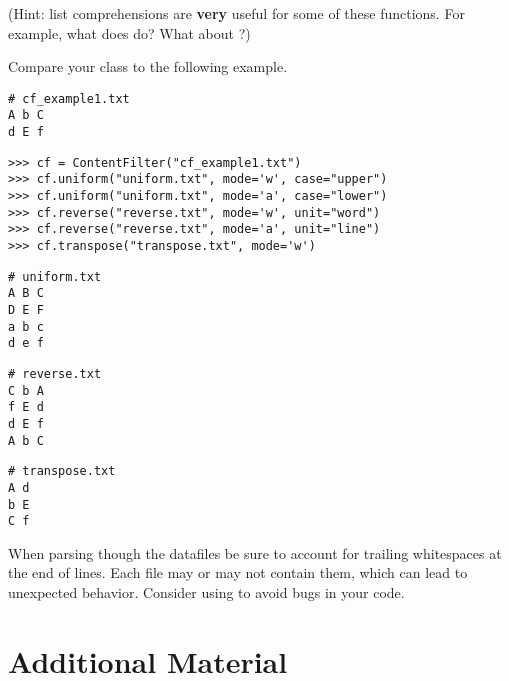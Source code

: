 \begin{problem}
\begin{enumerate}
\end{enumerate}

(Hint: list comprehensions are \textbf{very} useful for some of these functions.
For example, what does  do?
What about ?)

Compare your class to the following example.

\begin{lstlisting}
# cf_example1.txt
A b C
d E f
\end{lstlisting}

\begin{lstlisting}
>>> cf = ContentFilter("cf_example1.txt")
>>> cf.uniform("uniform.txt", mode='w', case="upper")
>>> cf.uniform("uniform.txt", mode='a', case="lower")
>>> cf.reverse("reverse.txt", mode='w', unit="word")
>>> cf.reverse("reverse.txt", mode='a', unit="line")
>>> cf.transpose("transpose.txt", mode='w')
\end{lstlisting}

\begin{lstlisting}
# uniform.txt
A B C
D E F
a b c
d e f
\end{lstlisting}

\begin{lstlisting}
# reverse.txt
C b A
f E d
d E f
A b C
\end{lstlisting}

\begin{lstlisting}
# transpose.txt
A d
b E
C f
\end{lstlisting}

\begin{warn} %
    When parsing though the datafiles be sure to account for trailing whitespaces at the end of lines.
    Each file may or may not contain them, which can lead to unexpected behavior. 
    Consider using  to avoid bugs in your code.
\end{warn}

\end{problem}

\newpage

\section*{Additional Material} %


